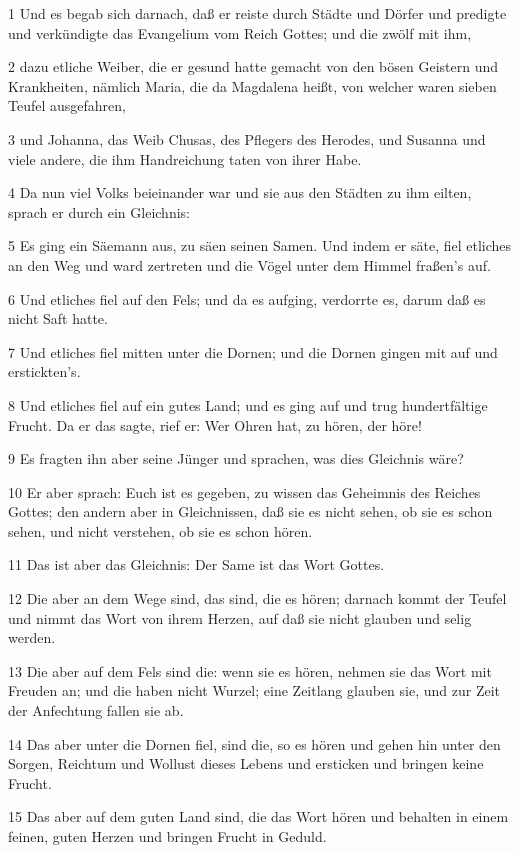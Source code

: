 \par 1 Und es begab sich darnach, daß er reiste durch Städte und Dörfer und predigte und verkündigte das Evangelium vom Reich Gottes; und die zwölf mit ihm,
\par 2 dazu etliche Weiber, die er gesund hatte gemacht von den bösen Geistern und Krankheiten, nämlich Maria, die da Magdalena heißt, von welcher waren sieben Teufel ausgefahren,
\par 3 und Johanna, das Weib Chusas, des Pflegers des Herodes, und Susanna und viele andere, die ihm Handreichung taten von ihrer Habe.
\par 4 Da nun viel Volks beieinander war und sie aus den Städten zu ihm eilten, sprach er durch ein Gleichnis:
\par 5 Es ging ein Säemann aus, zu säen seinen Samen. Und indem er säte, fiel etliches an den Weg und ward zertreten und die Vögel unter dem Himmel fraßen's auf.
\par 6 Und etliches fiel auf den Fels; und da es aufging, verdorrte es, darum daß es nicht Saft hatte.
\par 7 Und etliches fiel mitten unter die Dornen; und die Dornen gingen mit auf und erstickten's.
\par 8 Und etliches fiel auf ein gutes Land; und es ging auf und trug hundertfältige Frucht. Da er das sagte, rief er: Wer Ohren hat, zu hören, der höre!
\par 9 Es fragten ihn aber seine Jünger und sprachen, was dies Gleichnis wäre?
\par 10 Er aber sprach: Euch ist es gegeben, zu wissen das Geheimnis des Reiches Gottes; den andern aber in Gleichnissen, daß sie es nicht sehen, ob sie es schon sehen, und nicht verstehen, ob sie es schon hören.
\par 11 Das ist aber das Gleichnis: Der Same ist das Wort Gottes.
\par 12 Die aber an dem Wege sind, das sind, die es hören; darnach kommt der Teufel und nimmt das Wort von ihrem Herzen, auf daß sie nicht glauben und selig werden.
\par 13 Die aber auf dem Fels sind die: wenn sie es hören, nehmen sie das Wort mit Freuden an; und die haben nicht Wurzel; eine Zeitlang glauben sie, und zur Zeit der Anfechtung fallen sie ab.
\par 14 Das aber unter die Dornen fiel, sind die, so es hören und gehen hin unter den Sorgen, Reichtum und Wollust dieses Lebens und ersticken und bringen keine Frucht.
\par 15 Das aber auf dem guten Land sind, die das Wort hören und behalten in einem feinen, guten Herzen und bringen Frucht in Geduld.
